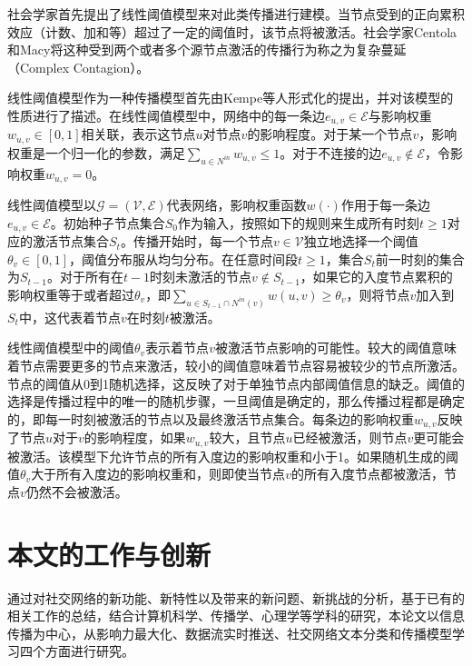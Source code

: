 社会学家首先提出了线性阈值模型来对此类传播进行建模。当节点受到的正向累积效应（计数、加和等）超过了一定的阈值时，该节点将被激活。社会学家Centola和Macy将这种受到两个或者多个源节点激活的传播行为称之为复杂蔓延（Complex Contagion）。

线性阈值模型作为一种传播模型首先由Kempe等人形式化的提出，并对该模型的性质进行了描述。在线性阈值模型中，网络中的每一条边$e_{u,v} \in \mathcal{E}$与影响权重$w_{u,v} \in \left[0,1\right]$相关联，表示这节点$u$对节点$v$的影响程度。对于某一个节点$v$，影响权重是一个归一化的参数，满足$\sum_{u \in N^{in}} w_{u,v} \leq 1$。对于不连接的边$e_{u,v} \notin \mathcal{E}$，令影响权重$w_{u,v} = 0$。

\begin{defn}[线性阈值模型]
\label{def:ltModel}
线性阈值模型以$\mathcal{G} = \left(\mathcal{V}, \mathcal{E}\right)$代表网络，影响权重函数$w\left( \cdot \right)$作用于每一条边$e_{u,v} \in \mathcal{E}$。初始种子节点集合$S_0$作为输入，按照如下的规则来生成所有时刻$t \geq 1$对应的激活节点集合$S_t$。传播开始时，每一个节点$v \in \mathcal{V}$独立地选择一个阈值$\theta_v \in \left[0,1\right]$，阈值分布服从均匀分布。在任意时间段$t \geq 1$，集合$S_t$前一时刻的集合为$S_{t-1}$。对于所有在$t-1$时刻未激活的节点$v \notin S_{t-1}$，如果它的入度节点累积的影响权重等于或者超过$\theta_v$，即$\sum_{u \in S_{t-1} \cap N^{in}\left(v\right)} w\left(u,v\right) \geq \theta_v$，则将节点$v$加入到$S_t$中，这代表着节点$v$在时刻$t$被激活。
\end{defn}

线性阈值模型中的阈值$\theta_v$表示着节点$v$被激活节点影响的可能性。较大的阈值意味着节点需要更多的节点来激活，较小的阈值意味着节点容易被较少的节点所激活。节点的阈值从0到1随机选择，这反映了对于单独节点内部阈值信息的缺乏。阈值的选择是传播过程中的唯一的随机步骤，一旦阈值是确定的，那么传播过程都是确定的，即每一时刻被激活的节点以及最终激活节点集合。每条边的影响权重$w_{u,v}$反映了节点$u$对于$v$的影响程度，如果$w_{u,v}$较大，且节点$u$已经被激活，则节点$v$更可能会被激活。该模型下允许节点的所有入度边的影响权重和小于1。如果随机生成的阈值$\theta_v$大于所有入度边的影响权重和，则即使当节点$v$的所有入度节点都被激活，节点$v$仍然不会被激活。
\section{本文的工作与创新}
\label{sec1:inovation}
通过对社交网络的新功能、新特性以及带来的新问题、新挑战的分析，基于已有的相关工作的总结，结合计算机科学、传播学、心理学等学科的研究，本论文以信息传播为中心，从影响力最大化、数据流实时推送、社交网络文本分类和传播模型学习四个方面进行研究。


